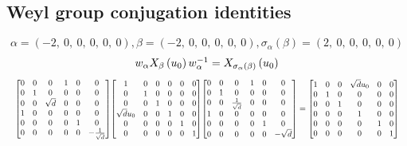 \documentclass[11pt]{article}
\theoremstyle{definition}
\begin{document}
\subsection{Weyl group conjugation identities}

\providecommand{\scaletoalign}[2]{%
  \sbox0{$#2$}%
  \ifdim\wd0>#1\relax 
    \resizebox{#1}{!}{\usebox0}%
  \else 
    \usebox0%
  \fi 
}
\[
\alpha = \left( -2, \  0, \  0, \  0, \  0, \  0\right), \beta = \left( -2, \  0, \  0, \  0, \  0, \  0\right), \sigma_{\alpha}(\beta) = \left( 2, \  0, \  0, \  0, \  0, \  0\right)
\]
\[
\scaletoalign{\textwidth}{w_{\alpha} X_{\beta}\left(u_{0}\right) w_{\alpha}^{-1} = X_{\sigma_{\alpha}\left(\beta\right)}\left(u_{0}\right)}
\]
\[
\scaletoalign{\textwidth}{{\left[\begin{matrix}0 & 0 & 0 & 1 & 0 & 0\\0 & 1 & 0 & 0 & 0 & 0\\0 & 0 & \sqrt{d} & 0 & 0 & 0\\1 & 0 & 0 & 0 & 0 & 0\\0 & 0 & 0 & 0 & 1 & 0\\0 & 0 & 0 & 0 & 0 & - \frac{1}{\sqrt{d}}\end{matrix}\right]} {\left[\begin{matrix}1 & 0 & 0 & 0 & 0 & 0\\0 & 1 & 0 & 0 & 0 & 0\\0 & 0 & 1 & 0 & 0 & 0\\\sqrt{d} u_{0} & 0 & 0 & 1 & 0 & 0\\0 & 0 & 0 & 0 & 1 & 0\\0 & 0 & 0 & 0 & 0 & 1\end{matrix}\right]} {\left[\begin{matrix}0 & 0 & 0 & 1 & 0 & 0\\0 & 1 & 0 & 0 & 0 & 0\\0 & 0 & \frac{1}{\sqrt{d}} & 0 & 0 & 0\\1 & 0 & 0 & 0 & 0 & 0\\0 & 0 & 0 & 0 & 1 & 0\\0 & 0 & 0 & 0 & 0 & - \sqrt{d}\end{matrix}\right]} = {\left[\begin{matrix}1 & 0 & 0 & \sqrt{d} u_{0} & 0 & 0\\0 & 1 & 0 & 0 & 0 & 0\\0 & 0 & 1 & 0 & 0 & 0\\0 & 0 & 0 & 1 & 0 & 0\\0 & 0 & 0 & 0 & 1 & 0\\0 & 0 & 0 & 0 & 0 & 1\end{matrix}\right]}}
\]
\end{document}
